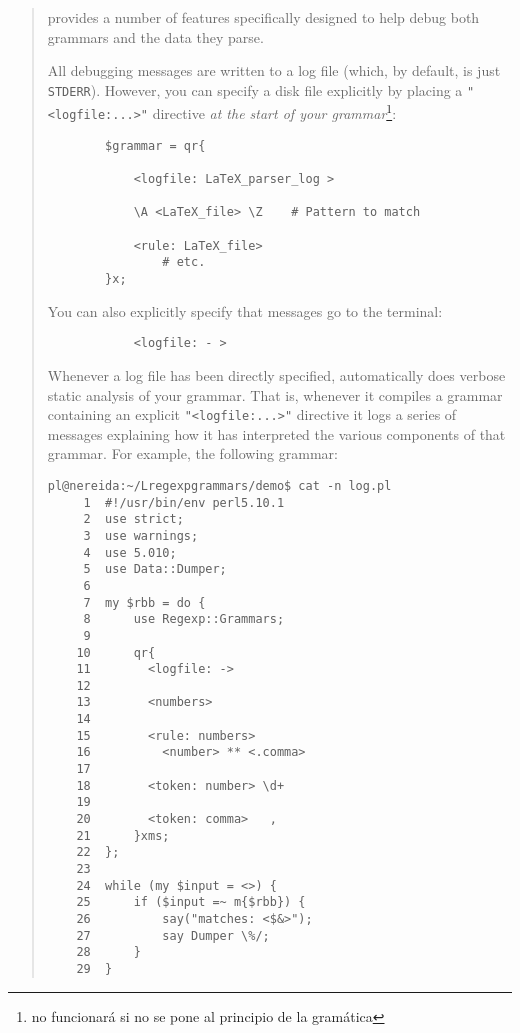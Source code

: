 \begin{it}\begin{quotation}
 provides a number of features specifically designed to
help debug both grammars and the data they parse.

    All debugging messages are written to a log file (which, by default, is
    just \verb|STDERR|). However, you can specify a disk file explicitly by placing
    a \verb|"<logfile:...>"| directive \emph{at the start of your grammar}\footnote{no funcionará si no se pone al principio
    de la gramática}:

\begin{verbatim}
        $grammar = qr{

            <logfile: LaTeX_parser_log >

            \A <LaTeX_file> \Z    # Pattern to match

            <rule: LaTeX_file>
                # etc.
        }x;
\end{verbatim}

    You can also explicitly specify that messages go to the terminal:

\begin{verbatim}
            <logfile: - >
\end{verbatim}


Whenever a log file has been directly specified, 
automatically does verbose static analysis of your grammar. That is,
whenever it compiles a grammar containing an explicit \verb|"<logfile:...>"|
directive it logs a series of messages explaining how it has interpreted
the various components of that grammar. For example, the following
grammar:

\begin{verbatim}
pl@nereida:~/Lregexpgrammars/demo$ cat -n log.pl
     1  #!/usr/bin/env perl5.10.1
     2  use strict;
     3  use warnings;
     4  use 5.010;
     5  use Data::Dumper;
     6
     7  my $rbb = do {
     8      use Regexp::Grammars;
     9
    10      qr{
    11        <logfile: ->
    12
    13        <numbers>
    14
    15        <rule: numbers>
    16          <number> ** <.comma>
    17
    18        <token: number> \d+
    19
    20        <token: comma>   ,
    21      }xms;
    22  };
    23
    24  while (my $input = <>) {
    25      if ($input =~ m{$rbb}) {
    26          say("matches: <$&>");
    27          say Dumper \%/;
    28      }
    29  }
\end{verbatim}


\end{quotation}
\end{it}
